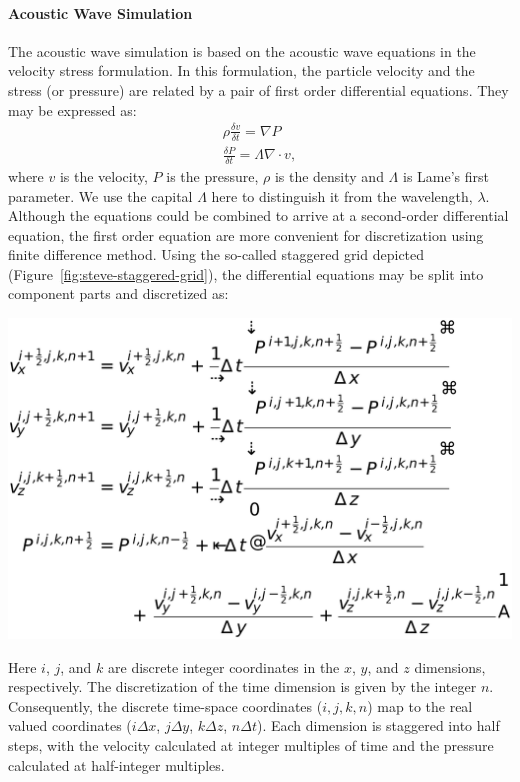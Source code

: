 \paragraph{Acoustic Wave Simulation}
The acoustic wave simulation is based on the acoustic wave equations in the
velocity stress formulation. In this formulation, the particle velocity and the
stress (or pressure) are related by a pair of first order differential
equations. They may be expressed as:
\begin{align*}
\rho \frac{\delta v}{\delta t} = \nabla P\\
\frac{\delta P}{\delta t} = \Lambda \nabla \cdot v,
\end{align*}
where $v$ is the velocity, $P$ is the pressure, $\rho$ is the density and
$\Lambda$ is Lame's first parameter.  We use the capital $\Lambda$ here to
distinguish it from the wavelength, $\lambda$. Although the equations could be
combined to arrive at a second-order differential equation, the first order
equation are more convenient for discretization using finite difference method.
Using the so-called staggered grid depicted (Figure~\ref{fig:steve-staggered-grid}), the differential
equations may be split into component parts and discretized as:

\centerline{\includegraphics[width=0.55\linewidth]{steve/figs/image7.png}}

Here $i$, $j$, and $k$ are discrete integer coordinates in the $x$, $y$, and
$z$ dimensions, respectively. The discretization of the time dimension is given
by the integer $n$. Consequently, the discrete time-space coordinates ($i, j,
k, n$) map to the real valued coordinates ($i \Delta x$, $j \Delta y$, $k\Delta
z$, $n \Delta t$). Each dimension is staggered into half steps, with the
velocity calculated at integer multiples of time and the pressure calculated at
half-integer multiples. 

